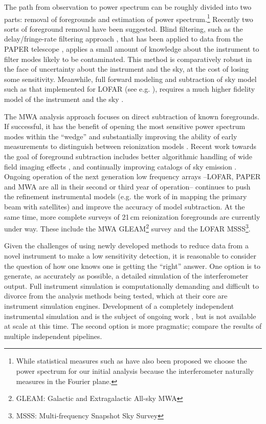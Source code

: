 \documentclass[preprint]{aastex}
\begin{document}
The path from observation to power spectrum can be roughly divided into two parts: removal of foregrounds and estimation of power spectrum.\footnote{While statistical measures  such as \citet{Barkana:2008p2154} have also been proposed we choose the power spectrum for our initial analysis because the interferometer naturally measures in the Fourier plane.}  Recently two sorts of foreground removal have been suggested. Blind filtering, such as the delay/fringe-rate filtering approach \citep{Parsons:2012p8896,Liu:2014p10462,Liu:2014p10463},  that has been applied to data from the PAPER telescope \citep{Parsons:2014p10499}, applies a small amount of knowledge about the instrument to filter modes likely to be contaminated.  This method is comparatively robust in the face of uncertainty about the instrument and the sky, at the cost of losing some sensitivity. Meanwhile,  full forward modeling and subtraction of sky model such as that implemented for LOFAR (see e.g. \cite{Jelic:2008p2130,Yatawatta:2013p9699}), requires a much higher fidelity model of the instrument and the sky \citep{Datta:2010p8781,Vedantham:2012p10297}.  

The MWA analysis approach focuses on direct subtraction of known foregrounds.  If successful, it has the benefit of opening the most sensitive power spectrum modes within the ``wedge'' and substantially improving the ability of early measurements to distinguish between reionization models \citep{Beardsley:2013p9952,Pober:2014p10390}. Recent work towards the goal of foreground subtraction includes better algorithmic handling of wide field imaging effects \citep{Tasse:2012p9459,Bhatnagar..2013ApJ,Sullivan:2012p9457,Ord:2010p8442}, and continually improving catalogs of sky emission \citep{deOliveiraCosta:2008p2242,Jacobs:2011p8438,Hurley-walker:2014p45,2014AAS...22342101M}. Ongoing operation of the next generation low frequency arrays --LOFAR, PAPER and MWA are all in their second or third year of operation-- continues to push the refinement instrumental models (e.g. the work of \cite{Neben:2015pxxx} in mapping the primary beam with satellites) and improve the accuracy of model subtraction.  At the same time, more complete surveys of 21\,cm reionization foregrounds are currently under way. These include the MWA GLEAM\footnote{GLEAM: Galactic and Extragalactic All-sky MWA} survey  and the LOFAR MSSS\footnote{MSSS: Multi-frequency Snapshot Sky Survey}.   %



Given the challenges of using newly developed methods to reduce data from a novel instrument to make a low sensitivity detection, it is reasonable to consider the question of how one knows one is getting the ``right'' answer.  One option is to generate, as accurately as possible, a detailed simulation of the interferometer output. Full instrument simulation is computationally demanding and difficult to divorce from the analysis methods being tested, which at their core are instrument simulation engines. Development of a completely independent instrumental simulation and is the subject of ongoing work \citep[see e.g..][]{2015arXiv150207596T}, but is not available at scale at this time.  The second option is more pragmatic; compare the results of multiple independent pipelines.  
\end{document}
